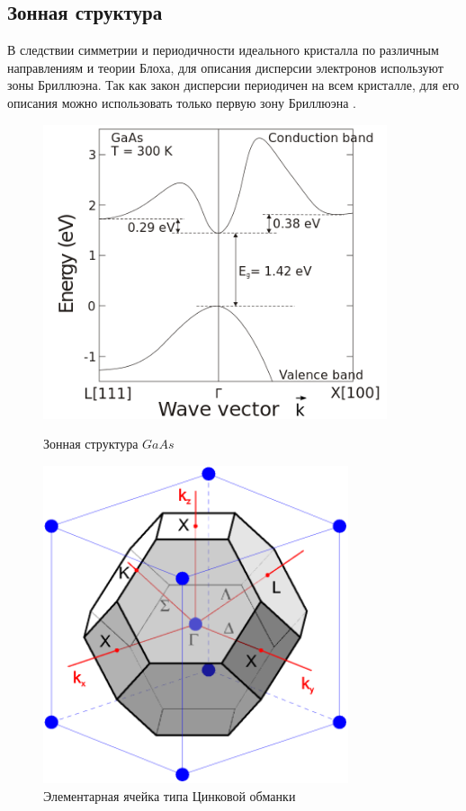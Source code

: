 \subsection{Зонная структура}
В следствии симметрии и периодичности идеального кристалла по различным направлениям и теории Блоха, для описания дисперсии электронов используют зоны Бриллюэна. Так как закон дисперсии периодичен на всем кристалле, для его описания можно использовать только первую зону Бриллюэна \cite{Kriger}. 
\begin{figure}[h]
    \begin{minipage}[b]{0.5\textwidth}
		\centering
	    \includegraphics[width=0.9\textwidth]{assets/GaAs_E}
	    \caption{Зонная структура $GaAs$}
	\end{minipage}
	\hfill
	\begin{minipage}[b]{0.45\textwidth}
		\centering
		\includegraphics[width=0.8\textwidth]{assets/ZnLaer}
	    \caption{Элементарная ячейка типа Цинковой обманки}
	\end{minipage}
\end{figure}

